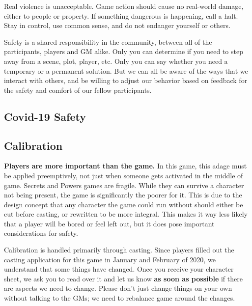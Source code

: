 \documentclass[sheet]{GL2020}
\begin{document}
Real violence is unacceptable. Game action should cause no real-world damage, either to people or property. If something dangerous is happening, call a halt. Stay in control, use common sense, and do not endanger yourself or others.

Safety is a shared responsibility in the community, between all of the participants, players and GM alike. Only you can determine if you need to step away from a scene, plot, player, etc. Only you can say whether you need a temporary or a permanent solution. But we can all be aware of the ways that we interact with others, and be willing to adjust our behavior based on feedback for the safety and comfort of our fellow participants.

\subsection{Covid-19 Safety}

\subsection{Calibration}
\textbf{Players are more important than the game.} In this game, this adage must be applied preemptively, not just when someone gets activated in the middle of game. Secrets and Powers games are fragile. While they can survive a character not being present, the game is significantly the poorer for it. This is due to the design concept that any character the game could run without should either be cut before casting, or rewritten to be more integral. This makes it way less likely that a player will be bored or feel left out, but it does pose important considerations for safety.

Calibration is handled primarily through casting. Since players filled out the casting application for this game in January and February of 2020, we understand that some things have changed. Once you receive your character sheet, we ask you to read over it and let us know \textbf{as soon as possible} if there are aspects we need to change. Please don’t just change things on your own without talking to the GMs; we need to rebalance game around the changes.
\end{document}
